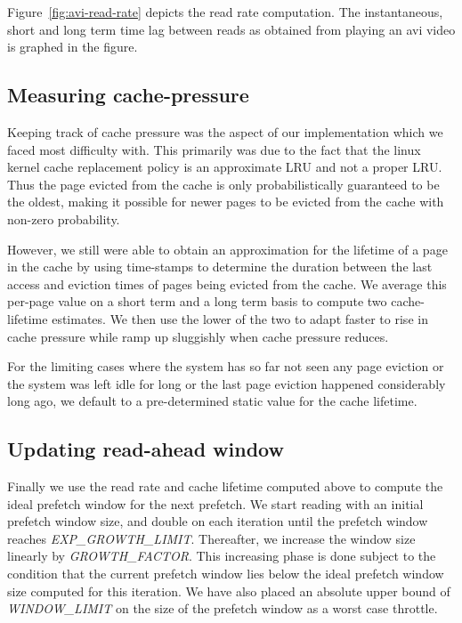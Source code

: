\documentclass[twocolumn,10pt]{article}
\begin{document}
Figure~\ref{fig:avi-read-rate} depicts the read rate computation. The instantaneous, short 
and long term time lag between reads as obtained from playing an avi video is graphed in 
the figure.

\subsection{Measuring cache-pressure}

Keeping track of cache pressure was the aspect of our implementation which we faced most
difficulty with. This primarily was due to the fact that the linux kernel cache replacement
policy is an approximate LRU and not a proper LRU. Thus the page evicted from the cache is
only probabilistically guaranteed to be the oldest, making it possible for newer pages to 
be evicted from the cache with non-zero probability.

However, we still were able to obtain an approximation for the lifetime of a page in the 
cache by using time-stamps to determine the duration between the last access and eviction
times of pages being evicted from the cache. We average this per-page value on a short term
and a long term basis to compute two cache-lifetime estimates. We then use the lower of the
two to adapt faster to rise in cache pressure while ramp up sluggishly when cache pressure
reduces.

For the limiting cases where the system has so far not seen any page eviction or the
system was left idle for long or the last page eviction happened considerably long ago,
we default to a pre-determined static value for the cache lifetime.

\subsection{Updating read-ahead window}

Finally we use the read rate and cache lifetime computed above to compute the ideal 
prefetch window for the next prefetch. We start reading with an initial prefetch 
window size, and double on each iteration until the prefetch window reaches
{\em EXP\_GROWTH\_LIMIT}. Thereafter, we increase the window size linearly by 
{\em GROWTH\_FACTOR}. This increasing phase is done subject to the condition that 
the current prefetch window lies below the ideal prefetch window size computed 
for this iteration. We have also placed an absolute upper bound of {\em WINDOW\_LIMIT}
on the size of the prefetch window as a worst case throttle.
\end{document}
